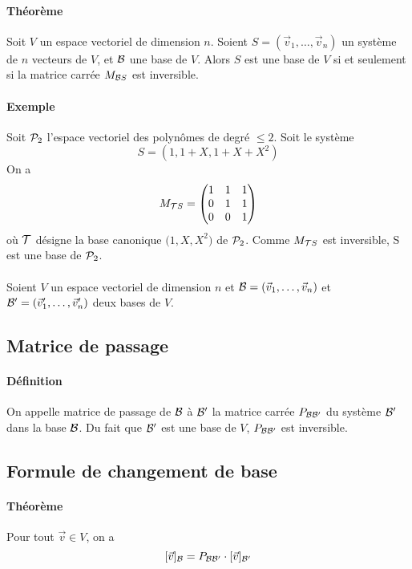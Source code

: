 \paragraph{Théorème} Soit $V$ un espace vectoriel de dimension $n$. Soient $S = (\vec{v}_1, \ldots, \vec{v}_n)$ un système de $n$ vecteurs de $V$, et $\mathcal{B}$ une base de $V$. Alors $S$ est une base de $V$ si et seulement si la matrice carrée $M_{\mathcal{B} S}$ est inversible.

\paragraph{Exemple} Soit $\mathcal{P}_2$ l'espace vectoriel des polynômes de degré $\leq 2$. Soit le système
$$S = (1, 1 + X, 1 + X + X^2)$$
On a 
$$M_{\mathcal{T} S} = \begin{pmatrix}
  1 & 1 & 1 \\
  0 & 1 & 1 \\
  0 & 0 & 1
\end{pmatrix}$$
où $\mathcal{T}$ désigne la base canonique $\big(1, X, X^2 \big)$ de $\mathcal{P}_2$. Comme $M_{\mathcal{T} S}$ est inversible, S est une base de $\mathcal{P}_2$.
\\\\
Soient $V$ un espace vectoriel de dimension $n$ et $\mathcal{B} = (\vec{v}_1, \ldots, \vec{v}_n)$ et $\mathcal{B}' = (\vec{v}'_1, \ldots, \vec{v}'_n)$ deux bases de $V$.

%
\subsection{Matrice de passage}
%
\paragraph{Définition} On appelle matrice de passage de $\mathcal{B}$ à $\mathcal{B}'$ la matrice carrée $P_{\mathcal{B} \mathcal{B}'}$ du système $\mathcal{B}'$ dans la base $\mathcal{B}$. Du fait que $\mathcal{B}'$ est une base de $V$, $P_{\mathcal{B} \mathcal{B}'}$ est inversible.

%
\subsection{Formule de changement de base}
%
\paragraph{Théorème} Pour tout $\vec{v} \in V$, on a 
$$[\vec{v}]_{\mathcal{B}} = P_{\mathcal{B} \mathcal{B}'} \cdot [\vec{v}]_{\mathcal{B}'}$$

